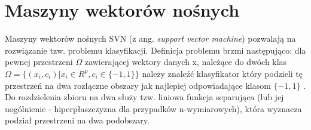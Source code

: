 \section{Maszyny wektorów nośnych}

Maszyny wektorów nośnych SVN (z ang. \textit{support vector machine}) pozwalają na rozwiązanie tzw. problemu klasyfikacji. Definicja problemu brzmi następująco: dla pewnej przestrzeni $\Omega$ zawierającej wektory danych x, należące do dwóch klas
$\Omega = \{(x_{i}, c_{i}) | x_{i} \in R^p, c_{i} \in \{-1,1\}\}$
należy znaleźć klasyfikator który podzieli tę przestrzeń na dwa rozłączne obszary jak najlepiej odpowiadające klasom $\{-1, 1\}$ \cite{stefanowski2010}. Do rozdzielenia zbioru na dwa służy tzw. liniowa funkcja separująca (lub jej uogólnienie - hiperpłaszczyzna dla przypadków n-wymiarowych), która wyznacza podział przestrzeni na dwa podobszary.

